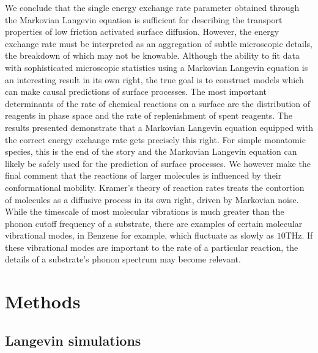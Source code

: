 \documentclass[7pt]{article}
\newcommand{\THz}{\si{\tera\hertz}}
\begin{document}
We conclude that the single energy exchange rate parameter obtained through the Markovian Langevin equation is sufficient for describing the transport properties of low friction activated surface diffusion. However, the energy exchange rate must be interpreted as an aggregation of subtle microscopic details, the breakdown of which may not be knowable. Although the ability to fit data with sophisticated microscopic statistics using a Markovian Langevin equation is an interesting result in its own right, the true goal is to construct models which can make causal predictions of surface processes. The most important determinants of the rate of chemical reactions on a surface are the distribution of reagents in phase space and the rate of replenishment of spent reagents. The results presented demonstrate that a Markovian Langevin equation equipped with the correct energy exchange rate gets precisely this right. For simple monatomic species, this is the end of the story and the Markovian Langevin equation can likely be safely used for the prediction of surface processes. We however make the final comment that the reactions of larger molecules is influenced by their conformational mobility. Kramer's theory of reaction rates\cite{Kramers, Zwanzig} treats the contortion of molecules as a diffusive process in its own right, driven by Markovian noise\cite{Kramers, Zwanzig}. While the timescale of most molecular vibrations is much greater than the phonon cutoff frequency of a substrate, there are examples of certain molecular vibrational modes, in Benzene for example\cite{Wang2020}, which fluctuate as slowly as $10\THz$. If these vibrational modes are important to the rate of a particular reaction, the details of a substrate's phonon spectrum may become relevant. 

\section*{Methods}

\subsection*{Langevin simulations}
\end{document}
